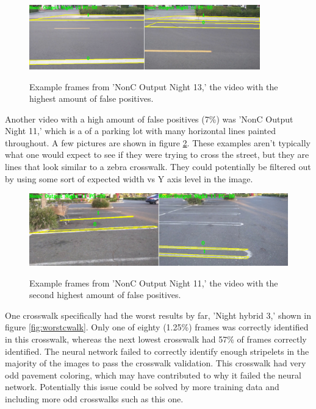 \documentclass[12pt]{ucthesis}
\newcommand{\captionfonts}{\small\bf\ssp}
\begin{document}
\begin{figure}[H]
\begin{center}
\includegraphics[width=10cm]{NonCWorstCwalk.png}
\captionfonts
\caption[Worst False Positive Examples]{Example frames from 'NonC Output Night 13,' the video with the highest amount of false positives.}
\label{fig:worstFalsePosPic}
\end{center}
\end{figure}

Another video with a high amount of false positives (7\%) was 'NonC Output Night 11,' which is a of a parking lot with many horizontal lines painted throughout.  A few pictures are shown in figure \ref{fig:2ndworstFalsePosPic}. These examples aren't typically what one would expect to see if they were trying to cross the street, but they are lines that look similar to a zebra crosswalk. They could potentially be filtered out by using some sort of expected width vs Y axis level in the image. 

\begin{figure}[H]
\begin{center}
\includegraphics[width=14cm]{NonC2ndWorstCwalk.png}
\captionfonts
\caption[Second Worst False Positive Examples]{Example frames from 'NonC Output Night 11,' the video with the second highest amount of false positives.}
\label{fig:2ndworstFalsePosPic}
\end{center}
\end{figure}

One crosswalk specifically had the worst results by far, 'Night hybrid 3,' shown in figure \ref{fig:worstcwalk}. Only one of eighty (1.25\%) frames was correctly identified in this crosswalk, whereas the next lowest crosswalk had 57\% of frames correctly identified. The neural network failed to correctly identify enough stripelets in the majority of the images to pass the crosswalk validation. This crosswalk had very odd pavement coloring, which may have contributed to why it failed the neural network.  Potentially this issue could be solved by more training data and including more odd crosswalks such as this one. 
\end{document}
